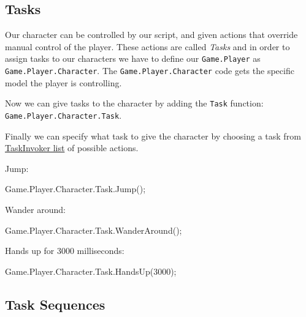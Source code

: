 \documentclass[
  openany]{book}
\newenvironment{Shaded}{\begin{snugshade}}{\end{snugshade}}
\newcommand{\DecValTok}[1]{\textcolor[rgb]{0.00,0.00,0.81}{#1}}
\newcommand{\FunctionTok}[1]{\textcolor[rgb]{0.00,0.00,0.00}{#1}}
\newcommand{\NormalTok}[1]{#1}
\begin{document}
\hypertarget{tasks}{%
\subsection*{Tasks}\label{tasks}}

Our character can be controlled by our script, and given actions that override manual control of the player. These actions are called \emph{Tasks} and in order to assign tasks to our characters we have to define our \texttt{Game.Player} as \texttt{Game.Player.Character}. The \texttt{Game.Player.Character} code gets the specific model the player is controlling.

Now we can give tasks to the character by adding the \texttt{Task} function: \texttt{Game.Player.Character.Task}.

Finally we can specify what task to give the character by choosing a task from \href{https://nitanmarcel.github.io/shvdn-docs.github.io/class_g_t_a_1_1_task_invoker.html}{TaskInvoker list} of possible actions.

Jump:

\begin{Shaded}
\begin{Highlighting}[]
\NormalTok{Game.}\FunctionTok{Player}\NormalTok{.}\FunctionTok{Character}\NormalTok{.}\FunctionTok{Task}\NormalTok{.}\FunctionTok{Jump}\NormalTok{();}
\end{Highlighting}
\end{Shaded}

Wander around:

\begin{Shaded}
\begin{Highlighting}[]
\NormalTok{Game.}\FunctionTok{Player}\NormalTok{.}\FunctionTok{Character}\NormalTok{.}\FunctionTok{Task}\NormalTok{.}\FunctionTok{WanderAround}\NormalTok{();}
\end{Highlighting}
\end{Shaded}

Hands up for 3000 milliseconds:

\begin{Shaded}
\begin{Highlighting}[]
\NormalTok{Game.}\FunctionTok{Player}\NormalTok{.}\FunctionTok{Character}\NormalTok{.}\FunctionTok{Task}\NormalTok{.}\FunctionTok{HandsUp}\NormalTok{(}\DecValTok{3000}\NormalTok{);}
\end{Highlighting}
\end{Shaded}

\hypertarget{task-sequences}{%
\subsection*{Task Sequences}\label{task-sequences}}
\end{document}
